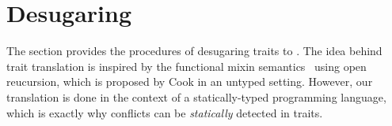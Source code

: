 \section{Desugaring}
\label{sec:desugar}


The section provides the procedures of desugaring traits to \bname. The idea
behind trait translation is inspired by the functional mixin
semantics~\cite{cook1989denotational} using open reucursion, which is proposed
by Cook in an untyped setting. However, our translation is done in the context
of a statically-typed programming language, which is exactly why conflicts can
be \textit{statically} detected in traits.
